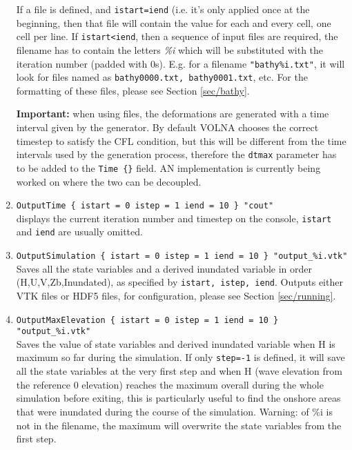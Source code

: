 \documentclass[11pt]{article}
\begin{document}
\begin{enumerate}
If a file is defined, and \texttt{istart=iend} (i.e. it's only applied once at the beginning, then that file will contain the value for each and every cell, one cell per line. If \texttt{istart<iend}, then a sequence of input files are required, the filename has to contain the letters \textit{\%i} which will be substituted with the iteration number (padded with 0s). E.g. for a filename \texttt{"bathy\%i.txt"}, it will look for files named as \texttt{bathy0000.txt, bathy0001.txt}, etc. For the formatting of these files, please see Section \ref{sec/bathy}.

\textbf{Important:} when using files, the deformations are generated with a time interval given by the generator. By default VOLNA chooses the correct timestep to satisfy the CFL condition, but this will be different from the time intervals used by the generation process, therefore the \texttt{dtmax} parameter has to be added to the \texttt{Time \{\}} field. AN implementation is currently being worked on where the two can be decoupled.

\item \texttt{OutputTime \{ istart = 0 istep = 1 iend = 10 \} "cout"}\\
displays the current iteration number and timestep on the console, \texttt{istart} and \texttt{iend} are usually omitted.

\item \texttt{OutputSimulation \{ istart = 0 istep = 1 iend = 10 \} "output\_\%i.vtk" } \\
Saves all the state variables and a derived inundated variable in order (H,U,V,Zb,Inundated), as specified by \texttt{istart, istep, iend}. Outputs either VTK files or HDF5 files, for configuration, please see Section \ref{sec/running}.

\item \texttt{OutputMaxElevation \{ istart = 0 istep = 1 iend = 10 \} "output\_\%i.vtk" } \\
Saves the value of state variables and derived inundated variable when H is maximum so far during the simulation. If only \texttt{step=-1} is defined, it will save all the state variables at the very first step and when H (wave elevation from the reference 0 elevation) reaches the maximum overall during the whole simulation before exiting, this is particularly useful to find the onshore areas that were inundated during the course of the simulation.  Warning: of \%i is not in the filename, the maximum will overwrite the state variables from the first step.


\end{enumerate}
\end{document}
